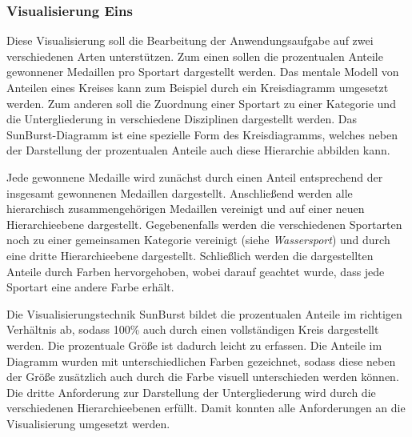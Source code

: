 \subsubsection{Visualisierung Eins}
Diese Visualisierung soll die Bearbeitung der Anwendungsaufgabe auf zwei verschiedenen Arten unterstützen. Zum einen sollen die prozentualen Anteile gewonnener Medaillen pro Sportart dargestellt werden. Das mentale Modell von Anteilen eines Kreises kann zum Beispiel durch ein Kreisdiagramm umgesetzt werden. Zum anderen soll die Zuordnung einer Sportart zu einer Kategorie und die Untergliederung in verschiedene Disziplinen dargestellt werden. Das SunBurst-Diagramm ist eine spezielle Form des Kreisdiagramms, welches neben der Darstellung der prozentualen Anteile auch diese Hierarchie abbilden kann.

Jede gewonnene Medaille wird zunächst durch einen Anteil entsprechend der insgesamt gewonnenen Medaillen dargestellt. Anschließend werden alle hierarchisch zusammengehörigen Medaillen vereinigt und auf einer neuen Hierarchieebene dargestellt. Gegebenenfalls werden die verschiedenen Sportarten noch zu einer gemeinsamen Kategorie vereinigt (siehe \textit{Wassersport}) und durch eine dritte Hierarchieebene dargestellt. Schließlich werden die dargestellten Anteile durch Farben hervorgehoben, wobei darauf geachtet wurde, dass jede Sportart eine andere Farbe erhält.

Die Visualisierungstechnik SunBurst bildet die prozentualen Anteile im richtigen Verhältnis ab, sodass 100\% auch durch einen vollständigen Kreis dargestellt werden. Die prozentuale Größe ist dadurch leicht zu erfassen. Die Anteile im Diagramm wurden mit unterschiedlichen Farben gezeichnet, sodass diese neben der Größe zusätzlich auch durch die Farbe visuell unterschieden werden können. Die dritte Anforderung zur Darstellung der Untergliederung wird durch die verschiedenen Hierarchieebenen erfüllt. Damit konnten alle Anforderungen an die Visualisierung umgesetzt werden.

